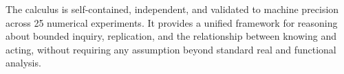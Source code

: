 \documentclass[twocolumn,11pt,a4paper]{article}
\begin{document}
The calculus is self-contained, independent, and validated to machine
precision across 25 numerical experiments. It provides a unified
framework for reasoning about bounded inquiry, replication, and the
relationship between knowing and acting, without requiring any assumption
beyond standard real and functional analysis.



\end{document}
